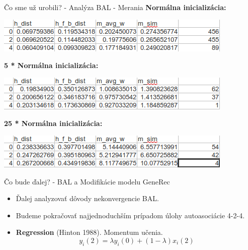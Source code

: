 \documentclass[xcolor=dvipsnames]{beamer}
\begin{document}
\begin{frame}{Čo sme už urobili? - Analýza BAL - Merania}
  \textbf{Normálna inicializácia:}
    \begin{center}
      \includegraphics[scale=0.5]{img/bal_stats_0.png}
    \end{center} 
  \textbf{5 * Normálna inicializácia:}
    \begin{center}
      \includegraphics[scale=0.5]{img/bal_stats_5.png}
    \end{center} 
  \textbf{25 * Normálna inicializácia:}
    \begin{center}
      \includegraphics[scale=0.5]{img/bal_stats_25.png}
    \end{center} 

\end{frame}


\begin{frame}{Čo bude ďalej? - BAL a Modifikácie modelu GeneRec}
  \begin{itemize}
    \item Ďalej analyzovať dôvody nekonvergencie BAL.
    \item Budeme pokračovať najjednoduchším prípadom úlohy autoasociácie 4-2-4. 
    \item \textbf{Regression} (Hinton 1988). Momentum učenia. 
    $$y_i(2) = \lambda y_i(0) + (1-\lambda)x_i(2)$$
  \end{itemize}
\end{frame}
\end{document}
